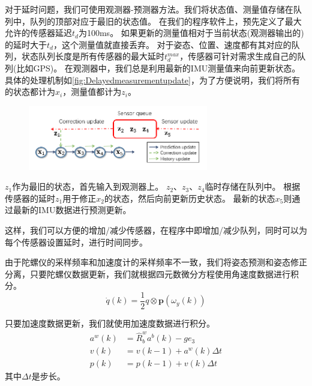 \documentclass[
  type=master
]{gdutthesis}
\begin{document}
对于延时问题，我们可使用观测器-预测器方法\cite{khosravian2014velocity}。我们将状态值、测量值存储在队列中，队列的顶部对应于最旧的状态值。
在我们的程序软件上，预先定义了最大允许的传感器延迟$t_d$为100ms。
如果更新的测量值相对于当前状态(观测器输出的)的延时大于$t_d$，这个测量值就直接丢弃。
对于姿态、位置、速度都有其对应的队列，状态队列长度是所有传感器的最大延时$t_d^{max}$，传感器可针对需求生成自己的队列(比如GPS)。
在观测器中，我们总是利用最新的IMU测量值来向前更新状态。
具体的处理机制如\autoref{fig:Delayedmeasurementupdate}，为了方便说明，我们将所有的状态都计为$x_i$，测量值都计为$z_i$。
\begin{figure}[htbp]
	\centering
	\includegraphics[width=0.7\textwidth]{Delayed and out-of-order measurement update.png}
	\label{fig:Delayedmeasurementupdate}
\end{figure} 

$z_1$作为最旧的状态，首先输入到观测器上。
$z_2$、$z_3$、$z_4$临时存储在队列中。
根据传感器的延时$z_1$用于修正$x_2$的状态，然后向前更新历史状态。
最新的状态$x_5$则通过最新的IMU数据进行预测更新。

这样，我们可以方便的增加/减少传感器，在程序中即增加/减少队列，同时可以为每个传感器设置延时，进行时间同步。

由于陀螺仪的采样频率和加速度计的采样频率不一致，我们将姿态预测和姿态修正分离，只要陀螺仪数据更新，我们就根据四元数微分方程使用角速度数据进行积分。
\begin{equation}\label{eq:quatint}
	\dot{q}(k)=\frac{1}{2} q \otimes \mathbf{p}(\omega_y(k))
\end{equation}

只要加速度数据更新，我们就使用加速度数据进行积分。
\begin{equation}\label{eq:pvpredict}
	\begin{aligned}
		a^w(k) &= \hat{R}_b^w a^b(k) - g e_3\\
		v(k) &= v(k-1) + a^w(k) \Delta t\\
		p(k) &= p(k-1) + v(k) \Delta t
	\end{aligned}
\end{equation}
其中$\Delta t$是步长。
\end{document}
